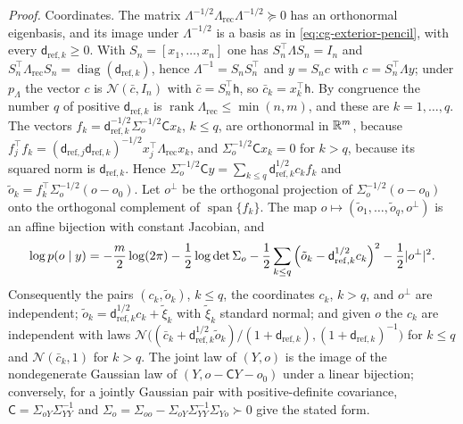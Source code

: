 \noindent\emph{Proof.}
Coordinates. The matrix \(\Lambda^{-1/2}\Lambda_{\mathrm{rec}}\Lambda^{-1/2}\succeq0\)
has an orthonormal eigenbasis, and its image under \(\Lambda^{-1/2}\) is a basis
as in \eqref{eq:cg-exterior-pencil}, with every \(\mathsf d_{\mathrm{ref},k}\geq0\).
With \(S_n=[x_1,\ldots,x_n]\) one has \(S_n^\top\Lambda S_n=I_n\) and
\(S_n^\top\Lambda_{\mathrm{rec}}S_n=\operatorname{diag}(\mathsf d_{\mathrm{ref},k})\),
hence \(\Lambda^{-1}=S_nS_n^\top\) and \(y=S_nc\) with \(c=S_n^\top\Lambda y\); under
\(p_\Lambda\) the vector \(c\) is \(\mathcal N(\bar c,I_n)\) with
\(\bar c=S_n^\top\mathsf h\), so \(\bar c_k=x_k^\top\mathsf h\). By congruence the
number \(q\) of positive \(\mathsf d_{\mathrm{ref},k}\) is
\(\operatorname{rank}\Lambda_{\mathrm{rec}}\leq\min(n,m)\), and these are
\(k=1,\ldots,q\). The vectors
\(f_k=\mathsf d_{\mathrm{ref},k}^{-1/2}\Sigma_o^{-1/2}\mathsf Cx_k\), \(k\leq q\), are
orthonormal in \(\mathbb R^m\), because
\(f_j^\top f_k=(\mathsf d_{\mathrm{ref},j}\mathsf d_{\mathrm{ref},k})^{-1/2}x_j^\top\Lambda_{\mathrm{rec}}x_k\),
and \(\Sigma_o^{-1/2}\mathsf Cx_k=0\) for \(k>q\), because its squared norm is
\(\mathsf d_{\mathrm{ref},k}\). Hence
\(\Sigma_o^{-1/2}\mathsf Cy=\sum_{k\leq q}\mathsf d_{\mathrm{ref},k}^{1/2}c_kf_k\) and
\(\tilde o_k=f_k^\top\Sigma_o^{-1/2}(o-o_0)\). Let \(o^\perp\) be the orthogonal
projection of \(\Sigma_o^{-1/2}(o-o_0)\) onto the orthogonal complement of
\(\operatorname{span}\{f_k\}\). The map \(o\mapsto(\tilde o_1,\ldots,\tilde o_q,o^\perp)\)
is an affine bijection with constant Jacobian, and
\begin{equation}
\log p(o\mid y)=-\frac m2\log(2\pi)-\frac12\log\det\Sigma_o
-\frac12\sum_{k\leq q}\left(\tilde o_k-\mathsf d_{\mathrm{ref},k}^{1/2}c_k\right)^2
-\frac12\lvert o^\perp\rvert^2 .
\label{eq:cg-exterior-whitened}
\end{equation}
Consequently the pairs \((c_k,\tilde o_k)\), \(k\leq q\), the coordinates \(c_k\),
\(k>q\), and \(o^\perp\) are independent; \(\tilde o_k=\mathsf d_{\mathrm{ref},k}^{1/2}c_k+\tilde\xi_k\)
with \(\tilde\xi_k\) standard normal; and given \(o\) the \(c_k\) are independent
with laws \(\mathcal N\bigl((\bar c_k+\mathsf d_{\mathrm{ref},k}^{1/2}\tilde o_k)/(1+\mathsf d_{\mathrm{ref},k}),(1+\mathsf d_{\mathrm{ref},k})^{-1}\bigr)\)
for \(k\leq q\) and \(\mathcal N(\bar c_k,1)\) for \(k>q\). The joint law of
\((Y,o)\) is the image of the nondegenerate Gaussian law of \((Y,o-\mathsf CY-o_0)\)
under a linear bijection; conversely, for a jointly Gaussian pair with
positive-definite covariance, \(\mathsf C=\Sigma_{oY}\Sigma_{YY}^{-1}\) and
\(\Sigma_o=\Sigma_{oo}-\Sigma_{oY}\Sigma_{YY}^{-1}\Sigma_{Yo}\succ0\) give the stated form.


